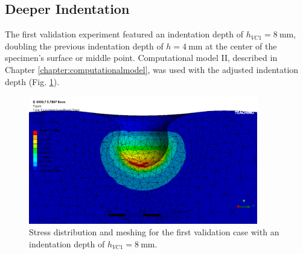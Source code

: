 \subsection{Deeper Indentation}
\label{subsection:8mm}
The first validation experiment featured an indentation depth of $h_{VC1}=\SI{8}{\milli \meter}$,
doubling the previous indentation depth of $h=\SI{4}{\milli \meter}$ at the center of the specimen's 
surface or middle point. Computational model II, described in Chapter \ref{chapter:computationalmodel},
was used with the adjusted indentation depth (Fig. \ref{fig:stressdis8mm}).\\

\begin{figure}%
	\centering
   \quad
   \includegraphics[width=10cm]{Images/validationcase/8mm/setstressdistribution.png}%
   \caption[Deeper indentation - Stress distribution]{Stress distribution and meshing for the first validation case with an indentation depth of $h_{VC1}=\SI{8}{\milli \meter}$.}%
   \label{fig:stressdis8mm}%
\end{figure}


